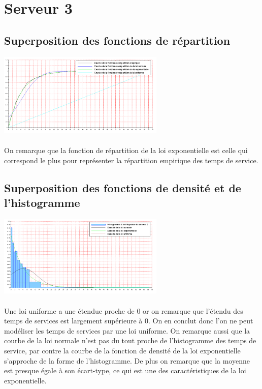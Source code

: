 \documentclass{article}
\begin{document}
\section{Serveur 3}

\subsection{Superposition des fonctions de répartition}
\begin{center}
\includegraphics[width=300px]{img/S3_repartitions.png}
\end{center}
\paragraph{}
On remarque que la fonction de répartition de la loi exponentielle est celle qui correspond le plus pour représenter la répartition empirique des temps de service.

\subsection{Superposition des fonctions de densité et de l'histogramme}
\begin{center}
\includegraphics[width=300px]{img/S3_densite.png}
\end{center}
\paragraph{}
Une loi uniforme a une étendue proche de 0 or on remarque que l’étendu des temps de services est largement supérieure à 0. On en conclut donc l’on ne peut modéliser les temps de services par une loi uniforme. On remarque aussi que la courbe de la loi normale n’est pas du tout proche de l’histogramme des temps de service, par contre la courbe de la fonction de densité de la loi exponentielle s’approche de la forme de l’histogramme. De plus on remarque que la moyenne est presque égale à son écart-type, ce qui est une des caractéristiques de la loi exponentielle.
\end{document}
